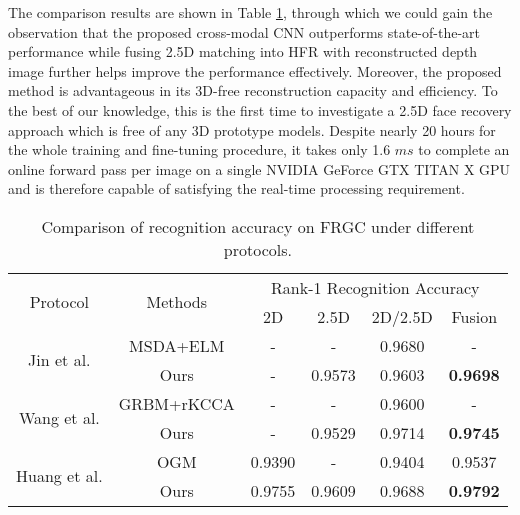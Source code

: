 \documentclass{bmvc2k}
\begin{document}
The comparison results are shown in Table \ref{recognition}, through which we could gain the observation that the proposed cross-modal CNN outperforms state-of-the-art performance while fusing 2.5D matching into HFR with reconstructed depth image further helps improve the performance effectively. Moreover, the proposed method is advantageous in its 3D-free reconstruction capacity and efficiency. To the best of our knowledge, this is the first time to investigate a 2.5D face recovery approach which is free of any 3D prototype models. Despite nearly 20 hours for the whole training and fine-tuning procedure, it takes only 1.6 $ms$ to complete an online forward pass per image on a single NVIDIA GeForce GTX TITAN X GPU and is therefore capable of satisfying the real-time processing requirement. 

\begin{table}
\begin{center}
\begin{tabular}{cccccc}
\hline
\multirow{2}{*}{Protocol} & \multirow{2}{*}{Methods} & \multicolumn{4}{c}{Rank-1 Recognition Accuracy} \\ \cline{3-6}
& & 2D & 2.5D & 2D/2.5D & Fusion \\
\hline
\multirow{2}{*}{Jin et al. \cite{jin2014cross}} & MSDA+ELM \cite{jin2014cross}                                        & -      & - & 0.9680 & - \\
                    & Ours & -      & 0.9573 & 0.9603      & \textbf{0.9698} \\      
\multirow{2}{*}{Wang et al. \cite{wang20142d}} & GRBM+rKCCA \cite{wang20142d}                                            & -      & - & 0.9600 & - \\
                    & Ours & -      & 0.9529 & 0.9714      & \textbf{0.9745} \\ 
\multirow{2}{*}{Huang et al. \cite{huang2012oriented}} & OGM \cite{huang2012oriented}                            & 0.9390 & - & 0.9404 & 0.9537 \\
                    & Ours & 0.9755      & 0.9609 & 0.9688      & \textbf{0.9792} \\ 
\hline
\end{tabular}
\end{center}
\caption{Comparison of recognition accuracy on FRGC under different protocols.}
\label{recognition}
\end{table}
\end{document}
